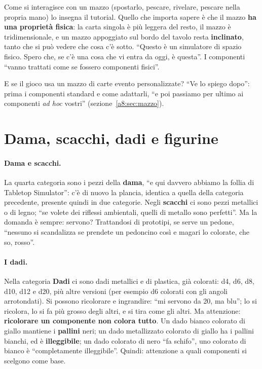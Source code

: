 Come si interagisce con un mazzo (spostarlo, pescare, rivelare, pescare nella propria
mano) lo insegna il tutorial. Quello che importa sapere è che il mazzo \textbf{ha una
proprietà fisica}: la carta singola è più leggera del resto, il mazzo è
tridimensionale, e un mazzo appoggiato sul bordo del tavolo resta \textbf{inclinato},
tanto che si può vedere che cosa c'è sotto. ``Questo è un simulatore di spazio fisico.
Spero che, se c'è una cosa che vi entra da oggi, è questa''. I componenti ``vanno
trattati come se fossero componenti fisici''.

E se il gioco usa un mazzo di carte evento personalizzate? ``Ve lo spiego dopo'': prima
i componenti standard e come adattarli, ``e poi passiamo per ultimo ai componenti
\emph{ad hoc} vostri'' (sezione~\ref{a8:sec:mazzo}).

\section{Dama, scacchi, dadi e figurine}
\label{a8:sec:dadi}

\paragraph{Dama e scacchi.} La quarta categoria sono i pezzi della \textbf{dama}, ``e
qui davvero abbiamo la follia di Tabletop Simulator'': c'è di nuovo la plancia,
identica a quella della categoria precedente, presente quindi in due categorie. Negli
\textbf{scacchi} ci sono pezzi metallici o di legno; ``se volete dei riflessi
ambientali, quelli di metallo sono perfetti''. Ma la domanda è sempre: servono?
Trattandosi di prototipi, se serve un pedone, ``nessuno si scandalizza se prendete un
pedoncino così e magari lo colorate, che so, rosso''.

\paragraph{I dadi.} Nella categoria \textbf{Dadi} ci sono dadi metallici e di plastica,
già colorati: d4, d6, d8, d10, d12 e d20, più altre versioni (per esempio d6 colorati
con gli angoli arrotondati). Si possono ricolorare e ingrandire: ``mi servono da 20,
ma blu''; lo si ricolora, lo si fa più grosso degli altri, e si tira come gli altri.
Ma attenzione: \textbf{ricolorare un componente non colora tutto}. Un dado bianco
colorato di giallo mantiene i \textbf{pallini} neri; un dado metallizzato colorato di
giallo ha i pallini bianchi, ed è \textbf{illeggibile}; un dado colorato di nero ``fa
schifo'', uno colorato di bianco è ``completamente illeggibile''. Quindi: attenzione a
quali componenti si scelgono come base.

